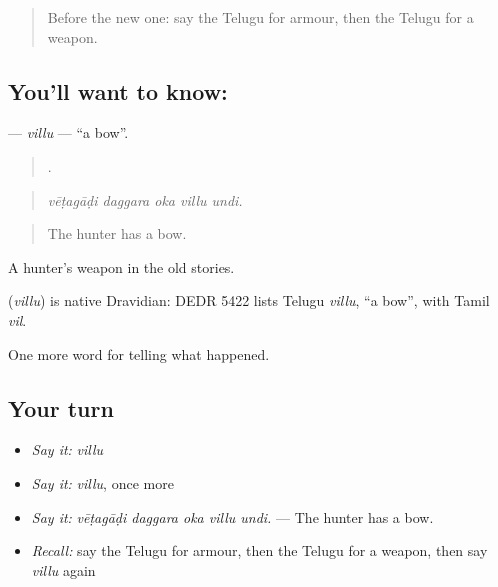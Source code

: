\label{lesson:TE-C360-villu}



\begin{quote}
Before the new one: say the Telugu for armour, then the Telugu for a weapon.
\end{quote}

\subsection*{You'll want to know: }
\textbf{} — \emph{villu} — \textquotedblleft{}a bow\textquotedblright{}.

\begin{quote}
    .
\end{quote}

\begin{quote}
\emph{vēṭagāḍi daggara oka villu undi.}
\end{quote}

\begin{quote}
The hunter has a bow.
\end{quote}

A hunter's weapon in the old stories.

\begin{cousinweb}
\textbf{} (\emph{villu}) is native Dravidian: DEDR 5422 lists Telugu \emph{villu}, \textquotedblleft{}a bow\textquotedblright{}, with Tamil \emph{vil}.
\end{cousinweb}

\begin{grammarlens}[title={What you've built}]
One more word for telling what happened.
\end{grammarlens}

\subsection*{Your turn}
\begin{itemize}
\raggedright
  \item \emph{Say it:} \emph{villu}
  \item \emph{Say it:} \emph{villu}, once more
  \item \emph{Say it:} \emph{vēṭagāḍi daggara oka villu undi.} — The hunter has a bow.
  \item \emph{Recall:} say the Telugu for armour, then the Telugu for a weapon, then say \emph{villu} again
\end{itemize}


